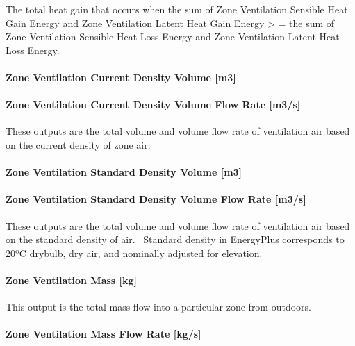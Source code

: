 The total heat gain that occurs when the sum of Zone Ventilation Sensible Heat Gain Energy and Zone Ventilation Latent Heat Gain Energy \textgreater{} = the sum of Zone Ventilation Sensible Heat Loss Energy and Zone Ventilation Latent Heat Loss Energy.

\paragraph{Zone Ventilation Current Density Volume {[}m3{]}}\label{zone-ventilation-current-density-volume-m3}

\paragraph{Zone Ventilation Current Density Volume Flow Rate {[}m3/s{]}}\label{zone-ventilation-current-density-volume-flow-rate-m3s}

These outputs are the total volume and volume flow rate of ventilation air based on the current density of zone air.

\paragraph{Zone Ventilation Standard Density Volume {[}m3{]}}\label{zone-ventilation-standard-density-volume-m3}

\paragraph{Zone Ventilation Standard Density Volume Flow Rate {[}m3/s{]}}\label{zone-ventilation-standard-density-volume-flow-rate-m3s}

These outputs are the total volume and volume flow rate of ventilation air based on the standard density of air.~ Standard density in EnergyPlus corresponds to 20ºC drybulb, dry air, and nominally adjusted for elevation.

\paragraph{Zone Ventilation Mass {[}kg{]}}\label{zone-ventilation-mass-kg}

This output is the total mass flow into a particular zone from outdoors.

\paragraph{Zone Ventilation Mass Flow Rate {[}kg/s{]}}\label{zone-ventilation-mass-flow-rate-kgs}

